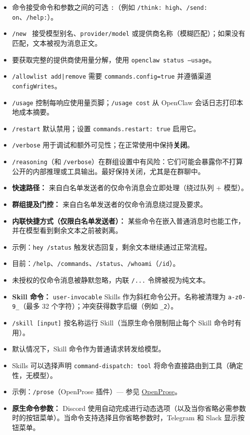 \begin{itemize}
  \item 命令接受命令和参数之间的可选 \texttt{:}（例如 \texttt{/think: high}、\texttt{/send: on}、\texttt{/help:}）。
  \item \texttt{/new } 接受模型别名、\texttt{provider/model} 或提供商名称（模糊匹配）；如果没有匹配，文本被视为消息正文。
  \item 要获取完整的提供商使用量分解，使用 \texttt{openclaw status --usage}。
  \item \texttt{/allowlist add|remove} 需要 \texttt{commands.config=true} 并遵循渠道 \texttt{configWrites}。
  \item \texttt{/usage} 控制每响应使用量页脚；\texttt{/usage cost} 从 OpenClaw 会话日志打印本地成本摘要。
  \item \texttt{/restart} 默认禁用；设置 \texttt{commands.restart: true} 启用它。
  \item \texttt{/verbose} 用于调试和额外可见性；在正常使用中保持\textbf{关闭}。
  \item \texttt{/reasoning}（和 \texttt{/verbose}）在群组设置中有风险：它们可能会暴露你不打算公开的内部推理或工具输出。最好保持关闭，尤其是在群聊中。
  \item \textbf{快速路径：} 来自白名单发送者的仅命令消息会立即处理（绕过队列 + 模型）。
  \item \textbf{群组提及门控：} 来自白名单发送者的仅命令消息绕过提及要求。
  \item \textbf{内联快捷方式（仅限白名单发送者）：} 某些命令在嵌入普通消息时也能工作，并在模型看到剩余文本之前被剥离。
  \item 示例：\texttt{hey /status} 触发状态回复，剩余文本继续通过正常流程。
  \item 目前：\texttt{/help}、\texttt{/commands}、\texttt{/status}、\texttt{/whoami}（\texttt{/id}）。
  \item 未授权的仅命令消息被静默忽略，内联 \texttt{/...} 令牌被视为纯文本。
  \item \textbf{Skill 命令：} \texttt{user-invocable} Skills 作为斜杠命令公开。名称被清理为 \texttt{a-z0-9\_}（最多 32 个字符）；冲突获得数字后缀（例如 \texttt{\_2}）。
  \item \texttt{/skill  [input]} 按名称运行 Skill（当原生命令限制阻止每个 Skill 命令时有用）。
  \item 默认情况下，Skill 命令作为普通请求转发给模型。
  \item Skills 可以选择声明 \texttt{command-dispatch: tool} 将命令直接路由到工具（确定性，无模型）。
  \item 示例：\texttt{/prose}（OpenProse 插件）— 参见 \href{/prose}{OpenProse}。
  \item \textbf{原生命令参数：} Discord 使用自动完成进行动态选项（以及当你省略必需参数时的按钮菜单）。当命令支持选择且你省略参数时，Telegram 和 Slack 显示按钮菜单。
\end{itemize}


